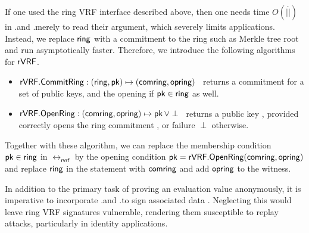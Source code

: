 


If one used the ring VRF interface described above, then one needs time
$O(|\ring|)$ in \rVRF.\rSign and \rVRF.\rVerify merely to read their \ring
argument, which severely limits applications.
Instead, we replace $ \mathsf{ring} $ with a commitment to the ring such as Merkle tree root and run asymptotically faster. Therefore, we introduce the following algorithms for $ {\mathsf{rVRF}} $.
\begin{itemize}
\item ${\mathsf{rVRF}}.{\mathsf{CommitRing}} : (\mathsf{ring},\mathsf{pk}) \mapsto (\mathsf{comring},\mathsf{opring})$ \,
    returns a commitment for a set \ring of public keys, and
     the opening \openring if $\mathsf{pk} \in \mathsf{ring}$ as well.
\item ${\mathsf{rVRF}}.{\mathsf{OpenRing}} : (\mathsf{comring},\mathsf{opring}) \mapsto \mathsf{pk} \, \lor \perp$ \,
    returns a public key \pk, provided \openring correctly opens
    the ring commitment \comring, or failure $\perp$ otherwise.
\end{itemize}

Together with these algorithm, we can replace the membership condition $\mathsf{pk} \in \mathsf{ring}$ in $  \rel_{\mathsf{rvrf}} $ by the opening condition
$ \mathsf{pk} = {\mathsf{rVRF}}.{\mathsf{OpenRing}}(\mathsf{comring},\mathsf{opring}) $ and replace $ \mathsf{ring} $ in the statement with $ \mathsf{comring} $ and add $ \mathsf{opring} $ to the witness.


In addition to the primary task of proving an evaluation value anonymously, it is imperative to incorporate \rVRF.\Sign and \rVRF.\Verify to sign associated data \aux. Neglecting this  would leave ring VRF signatures vulnerable, rendering them susceptible to replay attacks, particularly in identity applications. 



